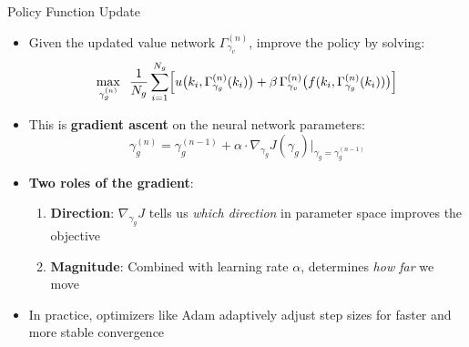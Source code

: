 \documentclass[10pt,english,aspectratio=169]{beamer}
\begin{document}
\begin{frame}{Policy Function Update}
\begin{itemize}
  \item Given the updated value network $\Gamma_{\gamma_v}^{(n)}$, improve the policy by solving:
    \[
      \max_{\gamma_g^{(n)}} \;\; \frac{1}{N_g}\sum_{i=1}^{N_g}\Bigl[ u\bigl(k_i, \Gamma_{\gamma_g}^{(n)}(k_i)\bigr) + \beta\, \Gamma_{\gamma_v}^{(n)}\bigl(f(k_i, \Gamma_{\gamma_g}^{(n)}(k_i))\bigr) \Bigr]
    \]
  \item This is \textbf{gradient ascent} on the neural network parameters:
    \[
      \gamma_g^{(n)} = \gamma_g^{(n-1)} + \alpha \cdot \nabla_{\gamma_g} J(\gamma_g)\Big|_{\gamma_g = \gamma_g^{(n-1)}}
    \]
  \medskip
  \item \textbf{Two roles of the gradient}:
    \begin{enumerate}
      \item \textbf{Direction}: $\nabla_{\gamma_g} J$ tells us \emph{which direction} in parameter space improves the objective
      \item \textbf{Magnitude}: Combined with learning rate $\alpha$, determines \emph{how far} we move
    \end{enumerate}
  \medskip
  \item In practice, optimizers like Adam adaptively adjust step sizes for faster and more stable convergence
\end{itemize}
\end{frame}
\end{document}
